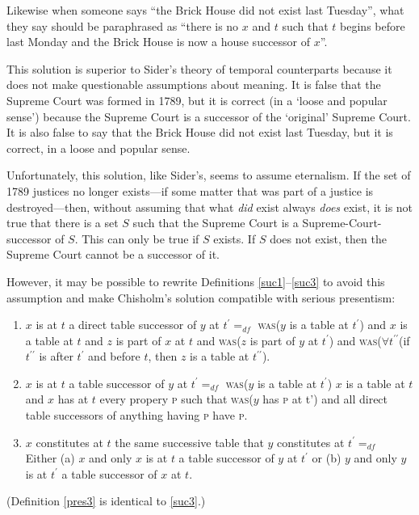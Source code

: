 \documentclass[11pt]{article}
\begin{document}
\begin{spacing}{1.5}
Likewise when someone says ``the Brick House did not exist last
Tuesday'', what they say should be paraphrased as ``there is no $x$
and $t$ such that $t$ begins before last Monday and the Brick House is
now a house successor of $x$''.

This solution is superior to Sider's theory of temporal counterparts
because it does not make questionable assumptions about meaning.  It
is false that the Supreme Court was formed in 1789, but it is correct
(in a `loose and popular sense') because the Supreme Court is a
successor of the `original' Supreme Court.  It is also false to say
that the Brick House did not exist last Tuesday, but it is correct, in
a loose and popular sense.

Unfortunately, this solution, like Sider's, seems to assume
eternalism.  If the set of 1789 justices no longer exists---if some
matter that was part of a justice is destroyed---then, without
assuming that what {\em did} exist always {\em does} exist, it is not
true that there is a set $S$ such that the Supreme Court is a
Supreme-Court-successor of $S$.  This can only be true if $S$ exists.
If $S$ does not exist, then the Supreme Court cannot be a successor of
it.

However, it may be possible to rewrite Definitions
\ref{suc1}--\ref{suc3} to avoid this assumption and make Chisholm's
solution compatible with serious presentism:

\begin{enumerate}[label=\arabic*a., ref=\arabic*a]
  \item $x$ is at $t$ a direct table successor of $y$ at $t^{\prime}
    =_{df}$ \textsc{was}($y$ is a table at $t^{\prime}$) and $x$ is a
    table at $t$ and $z$ is part of $x$ at $t$ and \textsc{was}($z$ is
    part of $y$ at $t^{\prime}$) and \textsc{was}($\forall
    t^{\prime\prime}$(if $t^{\prime\prime}$ is after $t^{\prime}$ and
    before $t$, then $z$ is a table at
    $t^{\prime\prime}$). \label{pres1}
  \item $x$ is at $t$ a table successor of $y$ at $t^{\prime} =_{df}$
    \textsc{was}($y$ is a table at $t^{\prime}$) $x$ is a table at $t$
    and $x$ has at $t$ every propery \textsc{p} such that
    \textsc{was}($y$ has \textsc{p} at t') and all direct table
    successors of anything having \textsc{p} have
    \textsc{p}. \label{pres2}
  \item $x$ constitutes at $t$ the same successive table that $y$
    constitutes at $t^{\prime} =_{df}$ Either (a) $x$ and only $x$ is
    at $t$ a table successor of $y$ at $t^{\prime}$ or (b) $y$ and
    only $y$ is at $t^{\prime}$ a table successor of $x$ at
    $t$. \label{pres3}
\end{enumerate}
(Definition \ref{pres3} is identical to \ref{suc3}.)


\end{spacing}
\end{document}
